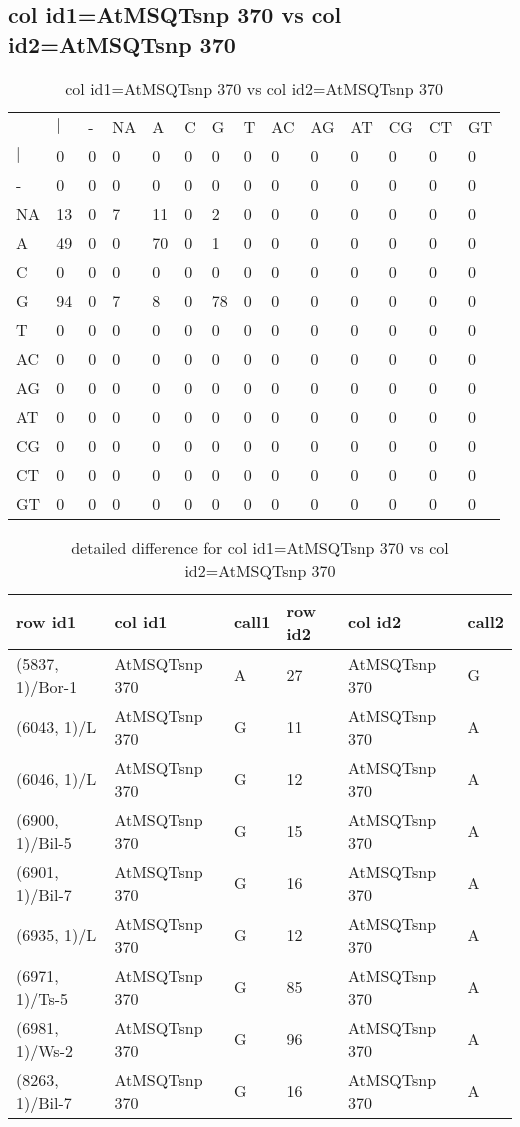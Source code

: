 \subsection{col id1=AtMSQTsnp 370 vs col id2=AtMSQTsnp 370}
\begin{center}
\begin{longtable}{|l|l|l|l|l|l|l|l|l|l|l|l|l|l|}
\caption{col id1=AtMSQTsnp 370 vs col id2=AtMSQTsnp 370} \label{table_dm882}\\
\hline
\\
\hline
&$|$&-&NA&A&C&G&T&AC&AG&AT&CG&CT&GT\\
$|$&0&0&0&0&0&0&0&0&0&0&0&0&0\\
-&0&0&0&0&0&0&0&0&0&0&0&0&0\\
NA&13&0&7&11&0&2&0&0&0&0&0&0&0\\
A&49&0&0&70&0&1&0&0&0&0&0&0&0\\
C&0&0&0&0&0&0&0&0&0&0&0&0&0\\
G&94&0&7&8&0&78&0&0&0&0&0&0&0\\
T&0&0&0&0&0&0&0&0&0&0&0&0&0\\
AC&0&0&0&0&0&0&0&0&0&0&0&0&0\\
AG&0&0&0&0&0&0&0&0&0&0&0&0&0\\
AT&0&0&0&0&0&0&0&0&0&0&0&0&0\\
CG&0&0&0&0&0&0&0&0&0&0&0&0&0\\
CT&0&0&0&0&0&0&0&0&0&0&0&0&0\\
GT&0&0&0&0&0&0&0&0&0&0&0&0&0\\
\hline
\end{longtable}
\end{center}

\begin{center}
\begin{longtable}{|l|l|l|l|l|l|}
\caption{detailed difference for col id1=AtMSQTsnp 370 vs col id2=AtMSQTsnp 370} \label{table_dm883}\\
\hline
row id1&col id1&call1&row id2&col id2&call2\\
\hline
(5837, 1)/Bor-1&AtMSQTsnp 370&A&27&AtMSQTsnp 370&G\\
(6043, 1)/L&AtMSQTsnp 370&G&11&AtMSQTsnp 370&A\\
(6046, 1)/L&AtMSQTsnp 370&G&12&AtMSQTsnp 370&A\\
(6900, 1)/Bil-5&AtMSQTsnp 370&G&15&AtMSQTsnp 370&A\\
(6901, 1)/Bil-7&AtMSQTsnp 370&G&16&AtMSQTsnp 370&A\\
(6935, 1)/L&AtMSQTsnp 370&G&12&AtMSQTsnp 370&A\\
(6971, 1)/Ts-5&AtMSQTsnp 370&G&85&AtMSQTsnp 370&A\\
(6981, 1)/Ws-2&AtMSQTsnp 370&G&96&AtMSQTsnp 370&A\\
(8263, 1)/Bil-7&AtMSQTsnp 370&G&16&AtMSQTsnp 370&A\\
\hline
\end{longtable}
\end{center}

